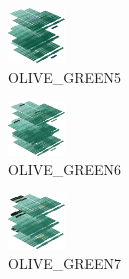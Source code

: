\hspace{0.1cm}
\begin{minipage}[b]{0.15\linewidth}
\begin{figure}[H]                                                          
  \centering                                                             
  \begin{adjustbox}{width=1.5cm,center}                                   
  \includegraphics[width=1.5cm]{src/colorspace_colourflow/flows/colourflow_181-45.png}%
  \end{adjustbox}                                                        
\caption*{OLIVE\_GREEN5}                                           
\end{figure}                                                               
\end{minipage}
\hspace{0.1cm}
\begin{minipage}[b]{0.15\linewidth}
\begin{figure}[H]                                                          
  \centering                                                             
  \begin{adjustbox}{width=1.5cm,center}                                   
  \includegraphics[width=1.5cm]{src/colorspace_colourflow/flows/colourflow_182-45.png}%
  \end{adjustbox}                                                        
\caption*{OLIVE\_GREEN6}                                           
\end{figure}                                                               
\end{minipage}
\hspace{0.1cm}
\begin{minipage}[b]{0.15\linewidth}
\begin{figure}[H]                                                          
  \centering                                                             
  \begin{adjustbox}{width=1.5cm,center}                                   
  \includegraphics[width=1.5cm]{src/colorspace_colourflow/flows/colourflow_183-45.png}%
  \end{adjustbox}                                                        
\caption*{OLIVE\_GREEN7}                                           
\end{figure}                                                               
\end{minipage}
